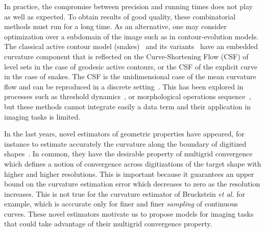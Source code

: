 \documentclass[review]{siamart220329}
\begin{document}
In practice, the compromise between precision and running times does
not play as well as expected. To obtain results of good quality, these
combinatorial methods must run for a long time. As an alternative, one
may consider optimization over a subdomain of the image such as in
contour-evolution models. The classical active contour model
(snakes)~\cite{kass1988snakes} and its
variants~\cite{caseles97geodesic,chan01} have an embedded curvature
component that is reflected on the Curve-Shortening Flow (CSF) of
level sets in the case of geodesic active contours, or the CSF of the
explicit curve in the case of snakes. The CSF is the
unidimensional case of the mean curvature flow and can be reproduced
in a discrete setting~\cite{merriman1992diffusion}. This has been
explored in processes such as threshold
dynamics~\cite{esedoglu2005threshold,esedoglu2008threshold}, or
morphological operations sequence~\cite{marquezneila14}, but these methods
cannot integrate easily a data term and their application in imaging tasks
is limited.

In the last years, novel estimators of geometric properties have appeared, for instance to estimate accurately the curvature along the boundary of digitized shapes~\cite{roussillon11mdca,schindele17mdca,coeurjolly13integral,coeurjolly12multigrid}. 
In common, they have the desirable property of multigrid convergence which defines
a notion of convergence across digitizations of the target shape with higher and
higher resolutions. This is important because it guarantees an upper bound on the curvature estimation error which decreases to zero as the resolution increases. This is not true for the curvature estimator of Bruckstein {\em et al.} \cite{bruckstein01convergence} for example, which is acccurate only for finer and finer {\em sampling} of continuous curves. These novel estimators motivate
us to propose models for imaging tasks that could take advantage of their multigrid
convergence property.
%
%
%
%
\end{document}
